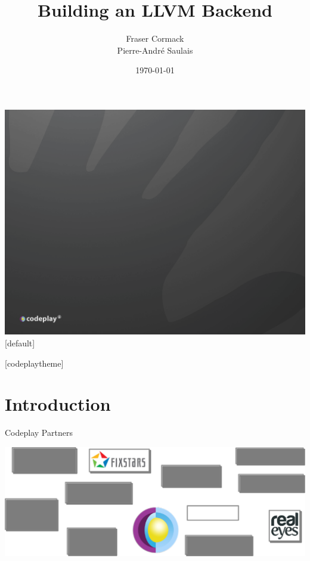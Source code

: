 \documentclass[t]{beamer}
\title{Building an LLVM Backend}
\subtitle{}
\author{Fraser Cormack \\ Pierre-André Saulais}
\institute{Codeplay Software \\ @codeplaysoft}
\date{\today}
\begin{document}
{\includegraphics[width=\paperwidth,height=\paperheight]{dark_background_title.png}}
[default]

\begin{frame}
  \vspace{4ex}
  \titlepage
\end{frame}


[codeplaytheme]

\section*{Introduction}


\begin{frame}{Codeplay Partners}

\vspace{7ex}

\includegraphics[width = 1.0\textwidth]{Partners.pdf}

\end{frame}
\end{document}
